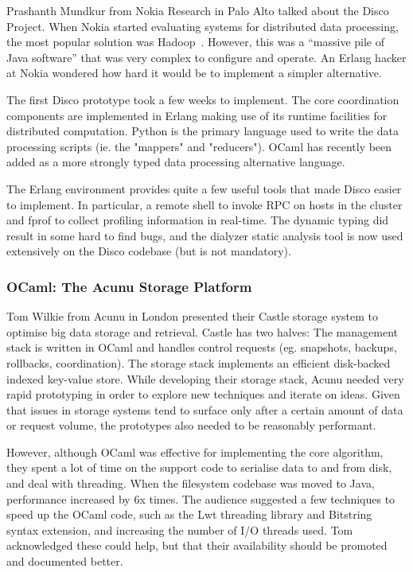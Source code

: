 \documentclass{jfp1}
\begin{document}
Prashanth Mundkur from Nokia Research in Palo Alto talked about the Disco Project.  When Nokia started evaluating systems for distributed data processing, the most popular solution was Hadoop~\cite{x}. However, this was a ``massive pile of Java software'' that was very complex to configure and operate. An Erlang hacker at Nokia wondered how hard it would be to implement a simpler alternative. 

The first Disco prototype took a few weeks to implement. The core coordination components are implemented in Erlang making use of its runtime facilities for distributed computation. Python is the primary language used to write the data processing scripts (ie. the "mappers" and "reducers"). OCaml has recently been added as a more strongly typed data processing alternative language.

The Erlang environment provides quite a few useful tools that made Disco easier to implement. In particular, a remote shell to invoke RPC on hosts in the cluster and fprof to collect profiling information in real-time. The dynamic typing did result in some hard to find bugs, and the dialyzer static analysis tool is now used extensively on the Disco codebase (but is not mandatory).

\subsubsection{OCaml: The Acunu Storage Platform}

Tom Wilkie from Acunu in London presented their Castle storage system to
optimise big data storage and retrieval. Castle has two halves: The management stack 
is written in OCaml and handles control requests (eg. snapshots, backups, rollbacks, 
coordination). The storage stack implements an efficient disk-backed indexed key-value
store. While developing their storage stack, Acunu needed very rapid prototyping in order
to explore new techniques and iterate on ideas. Given that issues in storage systems tend
to surface only after a certain amount of data or request volume, the prototypes also needed
to be reasonably performant.

However, although OCaml was effective for implementing the core algorithm, they
spent a lot of time on the support code to serialise data to and from disk, and
deal with threading. When the filesystem codebase was moved to Java,
performance increased by 6x times. The audience suggested a few techniques to
speed up the OCaml code, such as the Lwt threading library and Bitstring syntax
extension, and increasing the number of I/O threads used. Tom acknowledged
these could help, but that their availability should be promoted and documented
better. 
\end{document}
